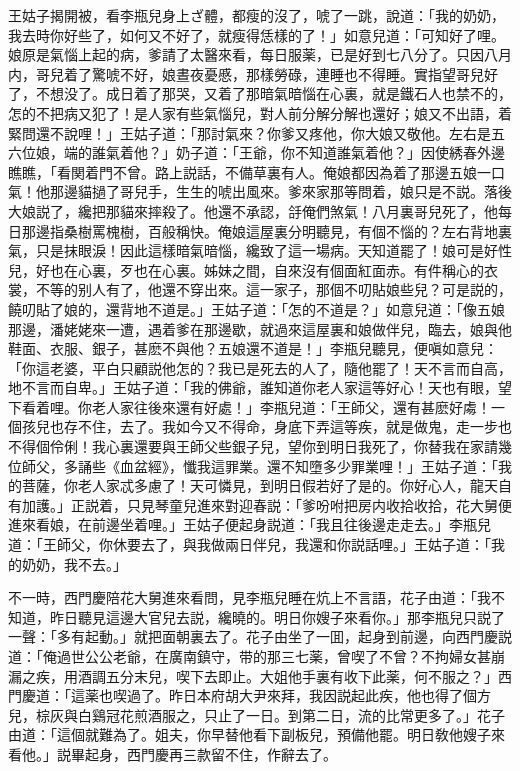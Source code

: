 王姑子揭開被，看李瓶兒身上ざ體，都瘦的沒了，唬了一跳，說道：「我的奶奶，我去時你好些了，如何又不好了，就瘦得恁樣的了！」如意兒道：「可知好了哩。娘原是氣惱上起的病，爹請了太醫來看，每日服薬，已是好到七八分了。只因八月内，哥兒着了驚唬不好，娘晝夜憂慼，那樣勞碌，連睡也不得睡。實指望哥兒好了，不想没了。成日着了那哭，又着了那暗氣暗惱在心裏，就是鐵石人也禁不的，怎的不把病又犯了！是人家有些氣惱兒，對人前分解分解也還好；娘又不出語，着緊問還不說哩！」王姑子道：「那討氣來？你爹又疼他，你大娘又敬他。左右是五六位娘，端的誰氣着他？」奶子道：「王爺，你不知道誰氣着他？」因使綉春外邊瞧瞧，「看関着門不曾。路上説話，不備草裏有人。俺娘都因為着了那邊五娘一口氣！他那邊貓撾了哥兒手，生生的唬出風來。爹來家那等問着，娘只是不説。落後大娘説了，纔把那貓來摔殺了。他還不承認，㧱俺們煞氣！八月裏哥兒死了，他每日那邊指桑樹罵槐樹，百般稱快。俺娘這屋裏分明聽見，有個不惱的？左右背地裏氣，只是抹眼淚！因此這樣暗氣暗惱，纔致了這一場病。天知道罷了！娘可是好性兒，好也在心裏，歹也在心裏。姊妹之間，自來沒有個面紅面赤。有件稱心的衣裳，不等的别人有了，他還不穿出來。這一家子，那個不叨貼娘些兒？可是説的，饒叨貼了娘的，還背地不道是。」王姑子道：「怎的不道是？」如意兒道：「像五娘那邊，潘姥姥來一遭，遇着爹在那邊歇，就過來這屋裏和娘做伴兒，臨去，娘與他鞋面、衣服、銀子，甚麽不與他？五娘還不道是！」李瓶兒聽見，便嗔如意兒：「你這老婆，平白只顧説他怎的？我已是死去的人了，隨他罷了！天不言而自高，地不言而自卑。」王姑子道：「我的佛爺，誰知道你老人家這等好心！天也有眼，望下看着哩。你老人家往後來還有好處！」李瓶兒道：「王師父，還有甚麽好䖏！一個孩兒也存不住，去了。我如今又不得命，身底下弄這等疾，就是做鬼，走一步也不得個伶俐！我心裏還要與王師父些銀子兒，望你到明日我死了，你替我在家請幾位師父，多誦些《血盆經》，懺我這罪業。還不知墮多少罪業哩！」王姑子道：「我的菩薩，你老人家忒多慮了！天可憐見，到明日假若好了是的。你好心人，龍天自有加護。」正説着，只見琴童兒進來對迎春説：「爹吩咐把房内收拾收拾，花大舅便進來看娘，在前邊坐着哩。」王姑子便起身説道：「我且往後邊走走去。」李瓶兒道：「王師父，你休要去了，與我做兩日伴兒，我還和你説話哩。」王姑子道：「我的奶奶，我不去。」

不一時，西門慶陪花大舅進來看問，見李瓶兒睡在炕上不言語，花子由道：「我不知道，昨日聽見這邊大官兒去説，纔曉的。明日你嫂子來看你。」那李瓶兒只説了一聲：「多有起動。」就把面朝裏去了。花子由坐了一囬，起身到前邊，向西門慶説道：「俺過世公公老爺，在廣南鎮守，带的那三七薬，曾喫了不曾？不拘婦女甚崩漏之疾，用酒調五分末兒，喫下去即止。大姐他手裏有收下此薬，何不服之？」西門慶道：「這薬也喫過了。昨日本府胡大尹來拜，我因説起此疾，他也得了個方兒，棕灰與白鷄冠花煎酒服之，只止了一日。到第二日，流的比常更多了。」花子由道：「這個就難為了。姐夫，你早替他看下副板兒，預備他罷。明日敎他嫂子來看他。」説畢起身，西門慶再三款留不住，作辭去了。

